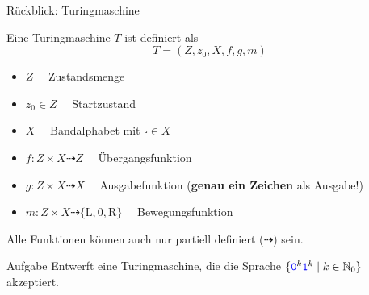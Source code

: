 \begin{frame}{Rückblick: Turingmaschine}
	\begin{Definition}
		Eine Turingmaschine $T$ ist definiert als $$ T = (Z, z_0 , X, f,g, m)$$
		\begin{itemize}[<+->]
			\item $Z \quad$ Zustandsmenge 
			\item $z_0\in Z \quad$ Startzustand
			\item $X \quad$ Bandalphabet mit $\square \in X$
			\item $f:Z\times X \dashrightarrow Z \quad$ Übergangsfunktion
			\item $g:Z\times X\dashrightarrow X \quad$ Ausgabefunktion  \quad (\textbf{genau ein Zeichen} als Ausgabe!)
			\item $m:Z\times X \dashrightarrow \{\text{L},\text{0},\text{R}\} \quad$ Bewegungsfunktion
		\end{itemize}
		\pause
		Alle Funktionen können auch nur partiell definiert ($\dashrightarrow$) sein. \\
	\end{Definition}
\end{frame}

\begin{frame}{Aufgabe}
	Entwerft eine Turingmaschine, die die Sprache $ \{\hbox{\textcolor{blue}{\texttt{0}}}^k\hbox{\textcolor{blue}{\texttt{1}}}^k \mid k\in \mathbb{N}_0 \} $ akzeptiert.
\end{frame}








